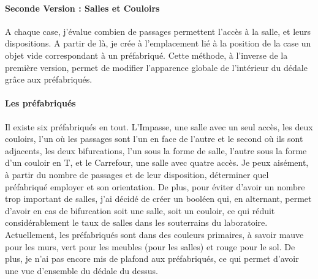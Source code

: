 \documentclass{article}
\begin{document}
\paragraph{Seconde Version : Salles et Couloirs}
A chaque case, j'évalue combien de passages permettent l'accès à la salle, et leurs dispositions. A partir de là, je crée à l'emplacement lié à la position de la case un objet vide correspondant à un préfabriqué. Cette méthode, à l'inverse de la première version, permet de modifier l'apparence globale de l'intérieur du dédale grâce aux préfabriqués.

\paragraph{Les préfabriqués}
Il existe six préfabriqués en tout. L'Impasse, une salle avec un seul accès, les deux couloirs, l'un où les passages sont l'un en face de l'autre et le second où ils sont adjacents, les deux bifurcations, l'un sous la forme de salle, l'autre sous la forme d'un couloir en T, et le Carrefour, une salle avec quatre accès. Je peux aisément, à partir du nombre de passages et de leur disposition, déterminer quel préfabriqué employer et son orientation. De plus, pour éviter d'avoir un nombre trop important de salles, j'ai décidé de créer un booléen qui, en alternant, permet d'avoir en cas de bifurcation soit une salle, soit un couloir, ce qui réduit considérablement le taux de salles dans les souterrains du laboratoire. Actuellement, les préfabriqués sont dans des couleurs primaires, à savoir mauve pour les murs, vert pour les meubles (pour les salles) et rouge pour le sol. De plus, je n'ai pas encore mis de plafond aux préfabriqués, ce qui permet d'avoir une vue d'ensemble du dédale du dessus.
\end{document}
